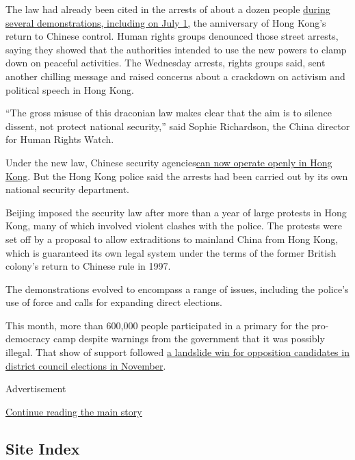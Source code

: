 The law had already been cited in the arrests of about a dozen people
\href{https://www.nytimes3xbfgragh.onion/2020/07/01/world/asia/hong-kong-security-law-china.html?searchResultPosition=8}{during
several demonstrations, including on July 1,} the anniversary of Hong
Kong's return to Chinese control. Human rights groups denounced those
street arrests, saying they showed that the authorities intended to use
the new powers to clamp down on peaceful activities. The Wednesday
arrests, rights groups said, sent another chilling message and raised
concerns about a crackdown on activism and political speech in Hong
Kong.

``The gross misuse of this draconian law makes clear that the aim is to
silence dissent, not protect national security,'' said Sophie
Richardson, the China director for Human Rights Watch.

Under the new law, Chinese security
agencies\href{https://www.nytimes3xbfgragh.onion/2020/07/02/world/asia/hong-kong-security-china.html?searchResultPosition=5}{can
now operate openly in Hong Kong}. But the Hong Kong police said the
arrests had been carried out by its own national security department.

Beijing imposed the security law after more than a year of large
protests in Hong Kong, many of which involved violent clashes with the
police. The protests were set off by a proposal to allow extraditions to
mainland China from Hong Kong, which is guaranteed its own legal system
under the terms of the former British colony's return to Chinese rule in
1997.

The demonstrations evolved to encompass a range of issues, including the
police's use of force and calls for expanding direct elections.

This month, more than 600,000 people participated in a primary for the
pro-democracy camp despite warnings from the government that it was
possibly illegal. That show of support followed
\href{https://www.nytimes3xbfgragh.onion/2019/11/24/world/asia/hong-kong-election-results.html}{a
landslide win for opposition candidates in district council elections in
November}.

Advertisement

\protect\hyperlink{after-bottom}{Continue reading the main story}

\hypertarget{site-index}{%
\subsection{Site Index}\label{site-index}}

